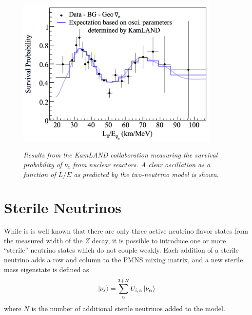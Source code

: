 \begin{figure}[ht!]
\centering
	\includegraphics[width=0.9\textwidth]{Figures/KAMLANDfig.png} \\
\caption{\textit{Results from the KamLAND collaboration measuring the survival probability of $\overline{\nu}_e$ from nuclear reactors. A clear oscillation as a function of $L/E$ as predicted by the two-neutrino model is shown.}}\label{KAMLANDfig}
\end{figure}

\section{Sterile Neutrinos}
While is is well known that there are only three active neutrino flavor states from the measured width of the $Z$ decay, it is possible to introduce one or more ``sterile'' neutrino states which do not couple weakly. Each addition of a sterile neutrino adds a row and column to the PMNS mixing matrix, and a new sterile mass eigenstate is defined as
\begin{equation}\label{sterilenuPMNSmixeqtn}
\Ket{\nu_s} = \sum_\alpha^{3+N} U_{i,\alpha}\Ket{\nu_\alpha}
\end{equation}
where $N$ is the number of additional sterile neutrinos added to the model.\\

